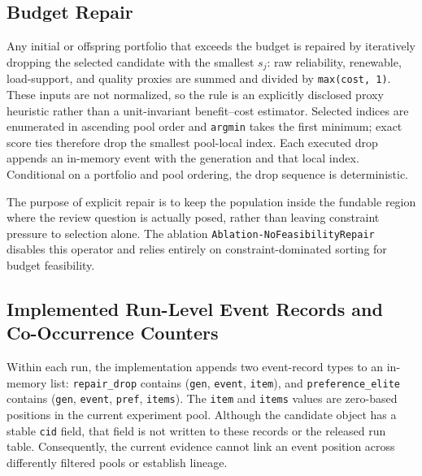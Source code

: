\documentclass[energies,article,submit,moreauthors]{Definitions/mdpi}
\begin{document}
\subsection{Budget Repair}\label{budget-repair}

Any initial or offspring portfolio that exceeds the budget is repaired by iteratively dropping the selected candidate with the smallest \(s_j\): raw reliability, renewable, load-support, and quality proxies are summed and divided by \texttt{max(cost,\ 1)}. These inputs are not normalized, so the rule is an explicitly disclosed proxy heuristic rather than a unit-invariant benefit--cost estimator. Selected indices are enumerated in ascending pool order and \texttt{argmin} takes the first minimum; exact score ties therefore drop the smallest pool-local index. Each executed drop appends an in-memory event with the generation and that local index. Conditional on a portfolio and pool ordering, the drop sequence is deterministic.

The purpose of explicit repair is to keep the population inside the fundable region where the review question is actually posed, rather than leaving constraint pressure to selection alone. The ablation \texttt{Ablation-NoFeasibilityRepair} disables this operator and relies entirely on constraint-dominated sorting for budget feasibility.

\subsection{Implemented Run-Level Event Records and Co-Occurrence Counters}\label{implemented-run-level-event-records-and-co-occurrence-counters}

Within each run, the implementation appends two event-record types to an in-memory list: \texttt{repair\_drop} contains (\texttt{gen}, \texttt{event}, \texttt{item}), and \texttt{preference\_elite} contains (\texttt{gen}, \texttt{event}, \texttt{pref}, \texttt{items}). The \texttt{item} and \texttt{items} values are zero-based positions in the current experiment pool. Although the candidate object has a stable \texttt{cid} field, that field is not written to these records or the released run table. Consequently, the current evidence cannot link an event position across differently filtered pools or establish lineage.
\end{document}
